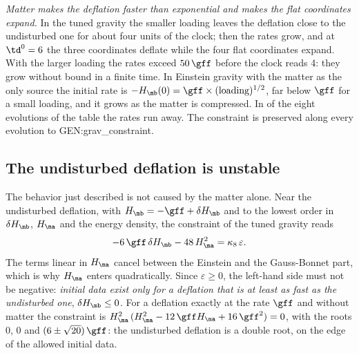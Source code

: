 \emph{Matter makes the deflation faster than exponential and makes the flat coordinates expand.} In
the tuned gravity the smaller loading leaves the deflation close to the undisturbed one for about
four units of the clock; then the rates grow, and at $\td^{0}=6$ the three coordinates deflate
 while the four flat
coordinates expand. With the larger loading the rates exceed $50\,\gff$ before the clock reads 4:
they grow without bound in a finite time. In Einstein gravity with the matter as the only source the
initial rate is $-H_{\mb}(0)=\gff\times(\text{loading})^{1/2}$, far below $\gff$ for a small loading,
and it grows as the matter is compressed. In  of
the eight evolutions of the table the rates run away. The constraint is preserved along
every evolution to {{GEN:grav_constraint}}.

\subsection{The undisturbed deflation is unstable}

The behavior just described is not caused by the matter alone. Near the undisturbed deflation, with
$H_{\mb}=-\gff+\delta H_{\mb}$ and to the lowest order in $\delta H_{\mb}$, $H_{\ma}$ and the energy
density, the constraint of the tuned gravity reads
\begin{equation}
-6\,\gff\,\delta H_{\mb}-48\,H_{\ma}^{2}=\kappa_8\,\varepsilon .
\label{eq:constraint}
\end{equation}
The terms linear in $H_{\ma}$ cancel between the Einstein and the Gauss-Bonnet part, which is why
$H_{\ma}$ enters quadratically. Since $\varepsilon\ge0$, the left-hand side must not be negative:
\emph{initial data exist only for a deflation that is at least as fast as the undisturbed one},
$\delta H_{\mb}\le0$. For a deflation exactly at the rate $\gff$ and without matter the constraint is
$H_{\ma}^{2}\,(H_{\ma}^{2}-12\,\gff H_{\ma}+16\,\gff^{2})=0$, with the roots $0$, $0$ and
$(6\pm\sqrt{20})\,\gff$: the undisturbed deflation is a double root, on the edge of the allowed
initial data.

